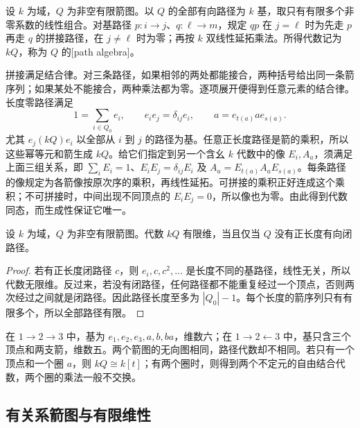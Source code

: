 \begin{definition}\label{b5:def:path-algebra}
	设 \(k\) 为域，\(Q\) 为非空有限箭图。以 \(Q\) 的全部有向路径为 \(k\) 基，取只有有限多个非零系数的线性组合。对基路径 \(p:i\to j\)、\(q:\ell\to m\)，规定 \(qp\) 在 \(j=\ell\) 时为先走 \(p\) 再走 \(q\) 的拼接路径，在 \(j\ne\ell\) 时为零；再按 \(k\) 双线性延拓乘法。所得代数记为 \(kQ\)，称为 \(Q\) 的[path algebra]。
\end{definition}
拼接满足结合律。对三条路径，如果相邻的两处都能接合，两种括号给出同一条箭序列；如果某处不能接合，两种乘法都为零。逐项展开便得到任意元素的结合律。长度零路径满足
\[
	1=\sum_{i\in Q_0}e_i,\qquad e_ie_j=\delta_{ij}e_i,\qquad a=e_{t(a)}a e_{s(a)}.
\]
尤其 \(e_j(kQ)e_i\) 以全部从 \(i\) 到 \(j\) 的路径为基。任意正长度路径是箭的乘积，所以这些幂等元和箭生成 \(kQ\)。给它们指定到另一个含幺 \(k\) 代数中的像 \(E_i,A_a\)，须满足上面三组关系，即 \(\sum_iE_i=1\)、\(E_iE_j=\delta_{ij}E_i\) 及 \(A_a=E_{t(a)}A_aE_{s(a)}\)。每条路径的像规定为各箭像按原次序的乘积，再线性延拓。可拼接的乘积正好连成这个乘积；不可拼接时，中间出现不同顶点的 \(E_iE_j=0\)，所以像也为零。由此得到代数同态，而生成性保证它唯一。
\begin{proposition}\label{b5:prop:finite-path-algebra}
	设 \(k\) 为域，\(Q\) 为非空有限箭图。代数 \(kQ\) 有限维，当且仅当 \(Q\) 没有正长度有向闭路径。
\end{proposition}
\begin{proof}
	若有正长度闭路径 \(c\)，则 \(e_i,c,c^2,\ldots\) 是长度不同的基路径，线性无关，所以代数无限维。反过来，若没有闭路径，任何路径都不能重复经过一个顶点，否则两次经过之间就是闭路径。因此路径长度至多为 \(|Q_0|-1\)。每个长度的箭序列只有有限多个，所以全部路径有限。
\end{proof}
在 \(1\to2\to3\) 中，基为 \(e_1,e_2,e_3,a,b,ba\)，维数六；在 \(1\to2\leftarrow3\) 中，基只含三个顶点和两支箭，维数五。两个箭图的无向图相同，路径代数却不相同。若只有一个顶点和一个圈 \(a\)，则 \(kQ\cong k[t]\)；有两个圈时，则得到两个不定元的自由结合代数，两个圈的乘法一般不交换。

\subsection{有关系箭图与有限维性}
\label{b5:subsec:0901:03}

